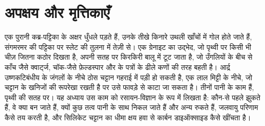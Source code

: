 \chapter{अपक्षय और मृत्तिकाएँ}\label{ch:b1:weathering-clays}

एक पुरानी कब्र-पट्टिका के अक्षर धुँधले पड़ते हैं, उनके तीखे किनारे उथली खाँचों में गोल होते जाते हैं, संगमरमर की पट्टिका पर स्लेट की तुलना में तेज़ी से। एक ग्रेनाइट का उद्भेद, जो पृथ्वी पर किसी भी चीज़ जितना कठोर दिखता है, अपनी सतह पर किरकिरी बालू में टूट जाता है, जो उँगलियों के बीच से काँच जैसे क्वार्ट्ज, चॉक-जैसे फ़ेल्डस्पार और  के पत्रों के ढीले कणों की तरह बहती है। आर्द्र उष्णकटिबंधीय के जंगलों के नीचे ठोस चट्टान गहराई में पड़ी हो सकती है, एक लाल मिट्टी के नीचे, जो चट्टान के खनिजों की रूपरेखा रखती है पर उसे फावड़े से काटा जा सकता है। तीनों पानी के काम हैं, पृथ्वी की सतह पर। यह अध्याय उस काम को रसायन-विज्ञान के रूप में लिखता है: कौन-से  पहले झुकते हैं, वे क्या बन जाते हैं, क्यों कुछ तत्व पानी के साथ निकल जाते हैं और अन्य रुकते हैं, जलवायु परिणाम कैसे तय करती है, और सिलिकेट चट्टान का धीमा क्षय हवा से कार्बन डाइऑक्साइड कैसे खींचता है।


